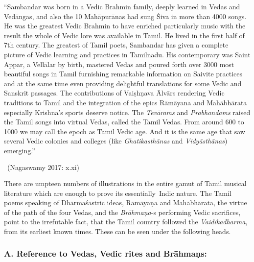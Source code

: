 \begin{myquote}
“Sambandar was born in a Vedic Brahmin family, deeply learned in Vedas and Vedāngas, and also the 10 Mahāpurānas had sung Śiva in more than 4000 songs. He was the greatest Vedic Brahmin to have enriched particularly music with the result the whole of Vedic lore was available in Tamil. He lived in the first half of 7th century. The greatest of Tamil poets, Sambandar has given a complete picture of Vedic learning and practices in Tamilnadu. His contemporary was Saint Appar, a Vellālar by birth, mastered Vedas and poured forth over 3000 most beautiful songs in Tamil furnishing remarkable information on Saivite practices and at the same time even providing delightful translations for some Vedic and Sanskrit passages. The contributions of Vaiṣhṇava Ālvārs rendering Vedic traditions to Tamil and the integration of the epics Rāmāyana and Mahābhārata especially Krishna’s sports deserve notice. The \textit{Tevārams} and \textit{Prabhandams} raised the Tamil songs into virtual Vedas, called the Tamil Vedas. From around 600 to 1000 we may call the epoch as Tamil Vedic age. And it is the same age that saw several Vedic colonies and colleges (like \textit{Ghatikasthānas} and \textit{Vidyāsthānas}) emerging.”

~\hfill (Nagaswamy 2017: x.xi)
\end{myquote}

There are umpteen numbers of illustrations in the entire gamut of Tamil musical literature which are enough to prove its essentially~Indic nature. The Tamil poems speaking of Dhārmaśāstric ideas, Rāmā\-yaṇa and Mahābhārata, the virtue of the path of the four Vedas, and the \textit{Brāhmaṇa}-s performing Vedic sacrifices, point to the irrefutable fact, that the Tamil country followed the \textit{Vaidikadharma}, from its earliest known times. These can be seen under the following heads.

\subsubsection*{A. Reference to Vedas, Vedic rites and Brāhmaṇs:}

